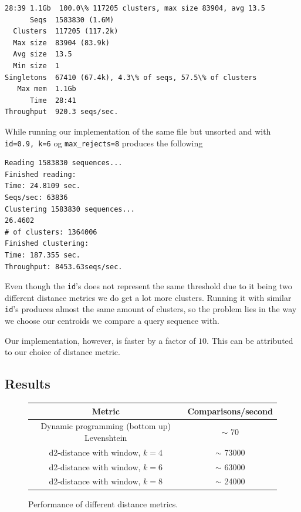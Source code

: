 \begin{lstlisting}
28:39 1.1Gb  100.0\% 117205 clusters, max size 83904, avg 13.5
      Seqs  1583830 (1.6M)
  Clusters  117205 (117.2k)
  Max size  83904 (83.9k)
  Avg size  13.5
  Min size  1
Singletons  67410 (67.4k), 4.3\% of seqs, 57.5\% of clusters
   Max mem  1.1Gb
      Time  28:41
Throughput  920.3 seqs/sec.
\end{lstlisting}
While running our implementation of the same file but unsorted and with \texttt{id=0.9, k=6} og \texttt{max\_rejects=8} produces the following
\begin{lstlisting}
Reading 1583830 sequences...
Finished reading:
Time: 24.8109 sec.
Seqs/sec: 63836
Clustering 1583830 sequences...
26.4602
# of clusters: 1364006
Finished clustering:
Time: 187.355 sec.
Throughput: 8453.63seqs/sec.
\end{lstlisting}
Even though the \texttt{id}'s does not represent the same threshold due to it
being two different distance metrics we do get a lot more clusters. Running
it with similar \texttt{id}'s produces almost the same amount of clusters, so
the problem lies in the way we choose our centroids we compare a query
sequence with.

Our implementation, however, is faster by a factor of $10$. This can be
attributed to our choice of distance metric.
\\


\subsection{Results}
\begin{figure}[H]
  \centering
  \begin{tabular}{ c | c }
    Metric                                        & Comparisons/second      \\
    \hline \hline
    Dynamic programming (bottom up) Levenshtein   & $\sim$ 70               \\
    \hline
    d2-distance with window, $k=4$                & $\sim$ 73000            \\
    \hline
    d2-distance with window, $k=6$                & $\sim$ 63000            \\
    \hline
    d2-distance with window, $k=8$                & $\sim$ 24000            \\
  \end{tabular}
  \caption{Performance of different distance metrics.}
\end{figure}

